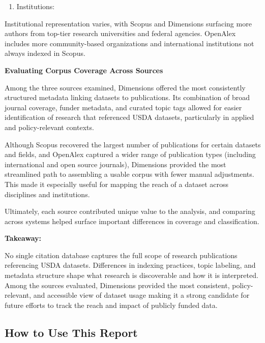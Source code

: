 \documentclass[
  letterpaper,
  DIV=11,
  numbers=noendperiod]{scrartcl}
\providecommand{\tightlist}{%
  \setlength{\itemsep}{0pt}\setlength{\parskip}{0pt}}\usepackage{longtable,booktabs,array}
\begin{document}
\begin{enumerate}
\def\labelenumi{\arabic{enumi}.}
\setcounter{enumi}{4}
\tightlist
\item
  Institutions:
\end{enumerate}

Institutional representation varies, with Scopus and Dimensions
surfacing more authors from top-tier research universities and federal
agencies. OpenAlex includes more community-based organizations and
international institutions not always indexed in Scopus.

\textbf{Evaluating Corpus Coverage Across Sources}

Among the three sources examined, Dimensions offered the most
consistently structured metadata linking datasets to publications. Its
combination of broad journal coverage, funder metadata, and curated
topic tags allowed for easier identification of research that referenced
USDA datasets, particularly in applied and policy-relevant contexts.

Although Scopus recovered the largest number of publications for certain
datasets and fields, and OpenAlex captured a wider range of publication
types (including international and open source journals), Dimensions
provided the most streamlined path to assembling a usable corpus with
fewer manual adjustments. This made it especially useful for mapping the
reach of a dataset across disciplines and institutions.

Ultimately, each source contributed unique value to the analysis, and
comparing across systems helped surface important differences in
coverage and classification.

\textbf{Takeaway:}

No single citation database captures the full scope of research
publications referencing USDA datasets. Differences in indexing
practices, topic labeling, and metadata structure shape what research is
discoverable and how it is interpreted. Among the sources evaluated,
Dimensions provided the most consistent, policy-relevant, and accessible
view of dataset usage making it a strong candidate for future efforts to
track the reach and impact of publicly funded data.

\subsection*{How to Use This Report}\label{how-to-use-this-report}
\end{document}

